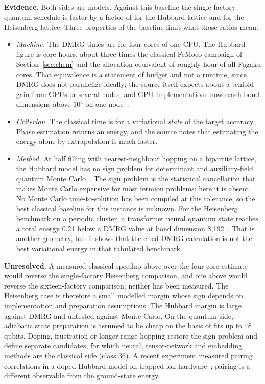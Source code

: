 \documentclass[10pt,a4paper]{article}
\begin{document}
\textbf{Evidence.} Both sides are models. Against this baseline the single-factory quantum schedule is faster by a factor of \ratioHubTen{} for the Hubbard lattice and \ratioHeis{} for the Heisenberg lattice. Three properties of the baseline limit what those ratios mean.
\begin{itemize}
\item \emph{Machine.} The DMRG times are for four cores of one CPU. The Hubbard figure is \hubTenCoreH{} core-hours, about three times the classical FeMoco campaign of Section~\ref{sec:chem} and the allocation equivalent of roughly \hubTenFugakuH{} hour of all Fugaku cores. That equivalence is a statement of budget and not a runtime, since DMRG does not parallelize ideally; the source itself expects about a tenfold gain from GPUs or several nodes, and GPU implementations now reach bond dimensions above $10^4$ on one node~\cite{legeza2026}.
\item \emph{Criterion.} The classical time is for a variational \emph{state} of the target accuracy. Phase estimation returns an energy, and the source notes that estimating the energy alone by extrapolation is much faster.
\item \emph{Method.} At half filling with nearest-neighbour hopping on a bipartite lattice, the Hubbard model has no sign problem for determinant and auxiliary-field quantum Monte Carlo~\cite{hirsch1985,leblanc2015}. The sign problem is the statistical cancellation that makes Monte Carlo expensive for most fermion problems; here it is absent. No Monte Carlo time-to-solution has been compiled at this tolerance, so the best classical baseline for this instance is unknown. For the Heisenberg benchmark on a periodic cluster, a transformer neural quantum state reaches a total energy 0.21 below a DMRG value at bond dimension 8{,}192~\cite{rende2024}. That is another geometry, but it shows that the cited DMRG calculation is not the best variational energy in that tabulated benchmark.
\end{itemize}

\textbf{Unresolved.} A measured classical speedup above \thrHeis{} over the four-core estimate would reverse the single-factory Heisenberg comparison, and one above \thrHeisPar{} would reverse the sixteen-factory comparison; neither has been measured. The Heisenberg case is therefore a small modelled margin whose sign depends on implementation and preparation assumptions. The Hubbard margin is large against DMRG and untested against Monte Carlo. On the quantum side, adiabatic state preparation is assumed to be cheap on the basis of fits up to 48 qubits. Doping, frustration or longer-range hopping restore the sign problem and define separate candidates, for which neural, tensor-network and embedding methods are the classical side (class 36). A recent experiment measured pairing correlations in a doped Hubbard model on trapped-ion hardware~\cite{granet2025}; pairing is a different observable from the ground-state energy.
\end{document}
